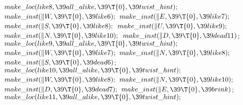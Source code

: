 ${}\\{make\_loc}(\\{like8},\39\\{all\_alike},\39\T{0},\39\\{twist\_hint});{}$\6
${}\\{make\_inst}(\|W,\39\T{0},\39\\{like6});{}$\6
${}\\{make\_inst}(\|E,\39\T{0},\39\\{like7});{}$\6
${}\\{make\_inst}(\|S,\39\T{0},\39\\{like8});{}$\6
${}\\{make\_inst}(\|U,\39\T{0},\39\\{like9});{}$\6
${}\\{make\_inst}(\|N,\39\T{0},\39\\{like10});{}$\6
${}\\{make\_inst}(\|D,\39\T{0},\39\\{dead11}){}$;\7
${}\\{make\_loc}(\\{like9},\39\\{all\_alike},\39\T{0},\39\\{twist\_hint});{}$\6
${}\\{make\_inst}(\|W,\39\T{0},\39\\{like7});{}$\6
${}\\{make\_inst}(\|N,\39\T{0},\39\\{like8});{}$\6
${}\\{make\_inst}(\|S,\39\T{0},\39\\{dead6}){}$;\7
${}\\{make\_loc}(\\{like10},\39\\{all\_alike},\39\T{0},\39\\{twist\_hint});{}$\6
${}\\{make\_inst}(\|W,\39\T{0},\39\\{like8});{}$\6
${}\\{make\_inst}(\|N,\39\T{0},\39\\{like10});{}$\6
${}\\{make\_inst}(\|D,\39\T{0},\39\\{dead7});{}$\6
${}\\{make\_inst}(\|E,\39\T{0},\39\\{brink}){}$;\7
${}\\{make\_loc}(\\{like11},\39\\{all\_alike},\39\T{0},\39\\{twist\_hint});{}$\6
